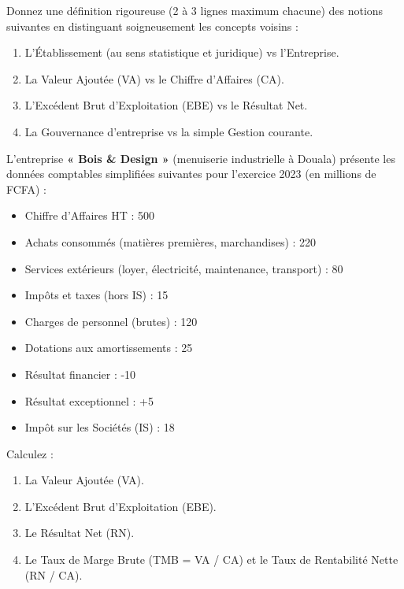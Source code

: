 \documentclass[11pt]{article}
\newcommand{\cle}[1]{{\popxbold\color{popdark}#1}}
\begin{document}
\begin{exercice}
Donnez une définition rigoureuse (2 à 3 lignes maximum chacune) des notions suivantes en distinguant soigneusement les concepts voisins :
\begin{enumerate}
    \item L'\cle{Établissement} (au sens statistique et juridique) vs l'\cle{Entreprise}.
    \item La \cle{Valeur Ajoutée (VA)} vs le \cle{Chiffre d'Affaires (CA)}.
    \item L'\cle{Excédent Brut d'Exploitation (EBE)} vs le \cle{Résultat Net}.
    \item La \cle{Gouvernance d'entreprise} vs la simple \cle{Gestion courante}.
\end{enumerate}
\end{exercice}

\begin{exercice}
L'entreprise \textbf{« Bois \& Design »} (menuiserie industrielle à Douala) présente les données comptables simplifiées suivantes pour l'exercice 2023 (en millions de FCFA) :
\begin{itemize}
    \item Chiffre d'Affaires HT : 500
    \item Achats consommés (matières premières, marchandises) : 220
    \item Services extérieurs (loyer, électricité, maintenance, transport) : 80
    \item Impôts et taxes (hors IS) : 15
    \item Charges de personnel (brutes) : 120
    \item Dotations aux amortissements : 25
    \item Résultat financier : -10
    \item Résultat exceptionnel : +5
    \item Impôt sur les Sociétés (IS) : 18
\end{itemize}
Calculez :
\begin{enumerate}
    \item La Valeur Ajoutée (VA).
    \item L'Excédent Brut d'Exploitation (EBE).
    \item Le Résultat Net (RN).
    \item Le Taux de Marge Brute (TMB = VA / CA) et le Taux de Rentabilité Nette (RN / CA).
\end{enumerate}
\end{exercice}
\end{document}
